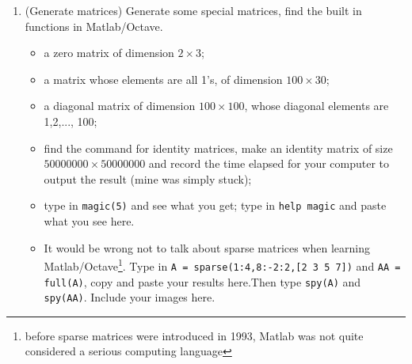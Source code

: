 \documentclass[12pt]{article}
\begin{document}
\begin{enumerate}
\item (Generate matrices) Generate some special matrices, find the built in functions in Matlab/Octave.
\begin{itemize}
\item a zero matrix of dimension $2\times 3$; \item a matrix whose elements are all 1's, of dimension $100\times 30$; \item a diagonal matrix of dimension $100\times 100$, whose diagonal elements are 1,2,..., 100; \item find the command for identity matrices, make an identity matrix of size $50000000\times 50000000$ and record the time elapsed for your computer to output the result (mine was simply stuck);\item type in {\tt magic(5)} and see what you get; type in {\tt help magic} and paste what you see here.
\item It would be wrong not to talk about sparse matrices when learning Matlab/Octave\footnote{before sparse matrices were introduced in 1993, Matlab was not quite considered a serious computing language}. Type in {\tt A = sparse(1:4,8:-2:2,[2 3 5 7])} and {\tt AA = full(A)}, copy and paste your results here.Then type {\tt spy(A)} and {\tt spy(AA)}. Include your images here.
\end{itemize}








\end{enumerate}
\end{document}
